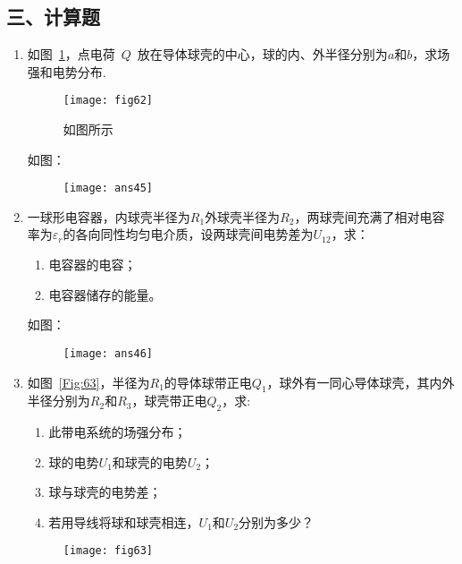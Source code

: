 \subsection*{三、计算题}
\begin{enumerate}
    \item 如图~\ref{Fig:62}，点电荷~$Q$~放在导体球壳的中心，球的内、外半径分别为$a$和$b$，求场强和电势分布.
    \begin{figure}[H]
        \centering
        \texttt{[image: fig62]}
        \caption{如图所示}\label{Fig:62}
    \end{figure}
    \vspace*{0.5cm}
    \begin{solution}
        如图：
        \begin{figure}[H]
            \centering
            \texttt{[image: ans45]}
        \end{figure}
    \end{solution}
    \item 一球形电容器，内球壳半径为$R_1$外球壳半径为$R_2$，两球壳间充满了相对电容率为$\varepsilon_r$的各向同性均匀电介质，设两球壳间电势差为$U_{12}$，求：
    \begin{enumerate}[label=(\arabic*)]
        \item 电容器的电容；
        \item 电容器储存的能量。
    \end{enumerate}
    \begin{solution}
        如图：
        \begin{figure}[H]
            \centering
            \texttt{[image: ans46]}
        \end{figure}
    \end{solution}
    \item 如图~\ref{Fig:63}，半径为$R_1$的导体球带正电$Q_1$，球外有一同心导体球壳，其内外半径分别为$R_2$和$R_3$，球壳带正电$Q_2$，求:
    \begin{enumerate}[label=(\arabic*)]
        \item 此带电系统的场强分布；
        \item 球的电势$U_1$和球壳的电势$U_2$；
        \item 球与球壳的电势差；
        \item 若用导线将球和球壳相连，$U_1$和$U_2$分别为多少？
    \end{enumerate}
    \begin{figure}[H]
        \centering
        \texttt{[image: fig63]}

\end{figure}
\end{enumerate}

